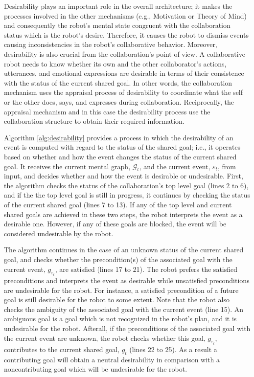 \documentclass[letterpaper]{article}
\begin{document}
Desirability plays an important role in the overall architecture; it makes the
processes involved in the other mechanisms (e.g., Motivation or Theory of Mind)
and consequently the robot's mental state congruent with the collaboration
status which is the robot's desire. Therefore, it causes the robot to dismiss
events causing inconsistencies in the robot's collaborative behavior. Moreover,
desirability is also crucial from the collaboration's point of view. A
collaborative robot needs to know whether its own and the other collaborator's
actions, utterances, and emotional expressions are desirable in terms of their
consistence with the status of the current shared goal. In other words, the
collaboration mechanism uses the appraisal process of desirability to coordinate
what the self or the other does, says, and expresses during collaboration.
Reciprocally, the appraisal mechanism and in this case the desirability process
use the collaboration structure to obtain their required information.

Algorithm \ref{alg:desirability} provides a process in which the desirability of
an event is computed with regard to the status of the shared goal; i.e., it
operates based on whether and how the event changes the status of the current
shared goal. It receives the current mental graph, $\mathcal{G}_{t}$, and the
current event, $\varepsilon_t$, from input, and decides whether and how the
event is desirable or undesirable. First, the algorithm checks the status of the
collaboration's top level goal (lines 2 to 6), and if the the top level goal is
still in progress, it continues by checking the status of the current shared
goal (lines 7 to 13). If any of the top level and current shared goals are
achieved in these two steps, the robot interprets the event as a desirable one.
However, if any of these goals are blocked, the event will be considered
undesirable by the robot. 

The algorithm continues in the case of an unknown status of the current shared
goal, and checks whether the precondition(s) of the associated goal with the
current event, $\mathit{g}_{\varepsilon_t}$, are satisfied (lines 17 to 21).
The robot prefers the satisfied preconditions and interprets the event as
desirable while unsatisfied preconditions are undesirable for the robot. For
instance, a satisfied precondition of a future goal is still desirable for the
robot to some extent. Note that the robot also checks the ambiguity of the
associated goal with the current event (line 15). An ambiguous goal is a goal
which is not recognized in the robot's plan, and it is undesirable for the
robot. Afterall, if the preconditions of the associated goal with the current
event are unknown, the robot checks whether this goal,
$\mathit{g}_{\varepsilon_t}$, contributes to the current shared goal,
$\mathit{g}_{t}$ (lines 22 to 25). As a result a contributing goal will obtain a
neutral desirability in comparison with a noncontributing goal which will be
undesirable for the robot.
\end{document}
